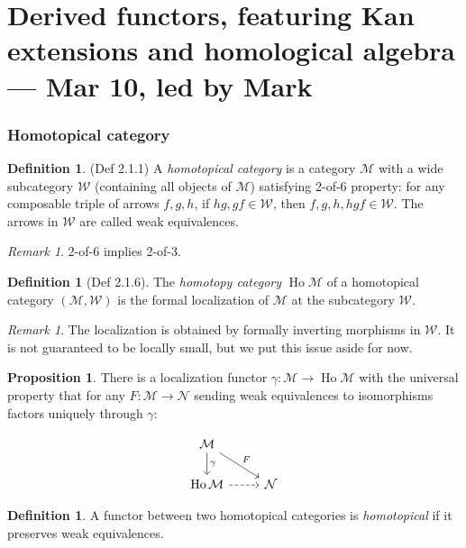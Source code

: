 \documentclass[11pt]{article}
\theoremstyle{definition}
\newtheorem{proposition}[theorem]{Proposition}
\newtheorem{definition}[theorem]{Definition}
\theoremstyle{remark}
\newtheorem{remark}[theorem]{Remark}
\newcommand{\Ho}{\operatorname{Ho}}
\newcommand{\calM}{\mathcal{M}}
\newcommand{\calN}{\mathcal{N}}
\newcommand{\calW}{\mathcal{W}}
\begin{document}
\newpage
\part{Derived functors, featuring Kan extensions and homological algebra --- Mar 10, led by Mark}
\setcounter{section}{0}
\section{Homotopical category}
\begin{definition}
    (Def 2.1.1)
    A \emph{homotopical category} is a category $\calM$ with a wide subcategory $\calW$ (containing all objects of $\calM$)
    satisfying 2-of-6 property:
    for any composable triple of arrows $f,g,h$,
    if $hg,gf\in \calW$, then $f,g,h,hgf \in \calW$.
    The arrows in $\calW$ are called weak equivalences.
\end{definition}

\begin{remark}
    2-of-6 implies 2-of-3.
\end{remark}

\begin{definition}[Def 2.1.6]
    The \emph{homotopy category} $\Ho\calM$ of a homotopical category $(\calM, \calW)$
    is the formal localization of $\calM$ at the subcategory $\calW$. 
\end{definition}

\begin{remark}
    The localization is obtained by formally inverting morphisms in $\calW$.
    It is not guaranteed to be locally small, but we put this issue aside for now.
\end{remark}

\begin{proposition}
    \label{universal-property-localization}
    There is a localization functor $\gamma : \calM \to \Ho\calM$ with
    the universal property that for any $F : \calM \to \calN$ sending weak equivalences to isomorphisms
    factors uniquely through $\gamma$:

    \[
    \begin{tikzcd}
        \calM \arrow[d, "\gamma"] \arrow[dr, "F"] & \\
        \Ho\calM \arrow[r, dashed] & \calN
    \end{tikzcd} 
    \]

\end{proposition}

\begin{definition}
    A functor between two homotopical categories is \emph{homotopical} if it preserves weak equivalences.
\end{definition}
\end{document}
